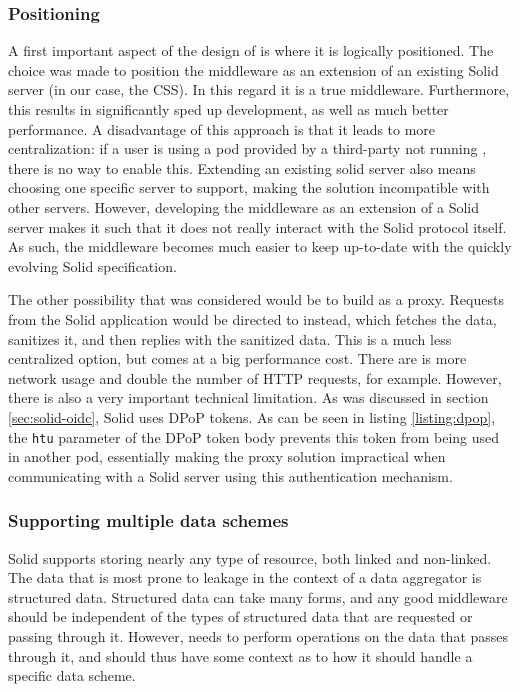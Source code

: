 \subsubsection{Positioning}
A first important aspect of the design of \middleware{} is where it is logically positioned. The choice was made to position the middleware as an extension of an existing Solid server (in our case, the \gls{CSS}). In this regard it is a true middleware. Furthermore, this results in significantly sped up development, as well as much better performance. A disadvantage of this approach is that it leads to more centralization: if a user is using a pod provided by a third-party not running \middleware{}, there is no way to enable this. Extending an existing solid server also means choosing one specific server to support, making the solution incompatible with other servers. However, developing the middleware as an extension of a Solid server makes it such that it does not really interact with the Solid protocol itself. As such, the middleware becomes much easier to keep up-to-date with the quickly evolving Solid specification. 

The other possibility that was considered would be to build \middleware{} as a proxy. Requests from the Solid application would be directed to \middleware{} instead, which fetches the data, sanitizes it, and then replies with the sanitized data. This is a much less centralized option, but comes at a big performance cost. There are is more network usage and double the number of HTTP requests, for example. However, there is also a very important technical limitation. As was discussed in section \ref{sec:solid-oidc}, Solid uses \gls{DPoP} tokens. As can be seen in listing \ref{listing:dpop}, the \texttt{htu} parameter of the \gls{DPoP} token body prevents this token from being used in another pod, essentially making the proxy solution impractical when communicating with a Solid server using this authentication mechanism.


\subsubsection{Supporting multiple data schemes}
Solid supports storing nearly any type of resource, both linked and non-linked. The data that is most prone to leakage in the context of a data aggregator is structured data. Structured data can take many forms, and any good middleware should be independent of the types of structured data that are requested or passing through it. However, \middleware{} needs to perform operations on the data that passes through it, and should thus have some context as to how it should handle a specific data scheme.

